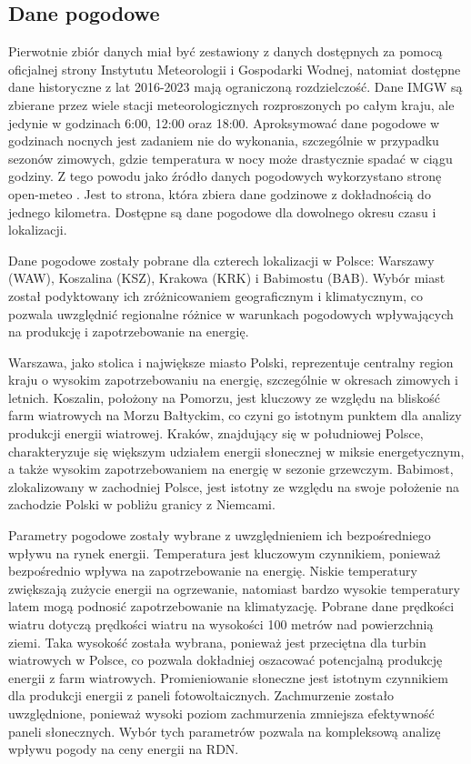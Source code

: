 \subsection{Dane pogodowe}
Pierwotnie zbiór danych miał być zestawiony z danych dostępnych za pomocą oficjalnej strony Instytutu Meteorologii i Gospodarki Wodnej, natomiat dostępne dane historyczne z lat 2016-2023 mają ograniczoną rozdzielczość. Dane IMGW są zbierane przez wiele stacji meteorologicznych rozproszonych po całym kraju, ale jedynie w godzinach 6:00, 12:00 oraz 18:00. Aproksymować dane pogodowe w godzinach nocnych jest zadaniem nie do wykonania, szczególnie w przypadku sezonów zimowych, gdzie temperatura w nocy może drastycznie spadać w ciągu godziny. Z tego powodu jako źródło danych pogodowych wykorzystano stronę open-meteo \cite{METEO}. Jest to strona, która zbiera dane godzinowe z dokładnością do jednego kilometra. Dostępne są dane pogodowe dla dowolnego okresu czasu i lokalizacji.

Dane pogodowe zostały pobrane dla czterech lokalizacji w Polsce: Warszawy (WAW), Koszalina (KSZ), Krakowa (KRK) i Babimostu (BAB). Wybór miast został podyktowany ich zróżnicowaniem geograficznym i klimatycznym, co pozwala uwzględnić regionalne różnice w warunkach pogodowych wpływających na produkcję i zapotrzebowanie na energię. 

Warszawa, jako stolica i największe miasto Polski, reprezentuje centralny region kraju o wysokim zapotrzebowaniu na energię, szczególnie w okresach zimowych i letnich. Koszalin, położony na Pomorzu, jest kluczowy ze względu na bliskość farm wiatrowych na Morzu Bałtyckim, co czyni go istotnym punktem dla analizy produkcji energii wiatrowej. Kraków, znajdujący się w południowej Polsce, charakteryzuje się większym udziałem energii słonecznej w miksie energetycznym, a także wysokim zapotrzebowaniem na energię w sezonie grzewczym. Babimost, zlokalizowany w zachodniej Polsce, jest istotny ze względu na swoje położenie na zachodzie Polski w pobliżu granicy z Niemcami.

Parametry pogodowe zostały wybrane z uwzględnieniem ich bezpośredniego wpływu na rynek energii.\newline
Temperatura jest kluczowym czynnikiem, ponieważ bezpośrednio wpływa na zapotrzebowanie na energię. Niskie temperatury zwiększają zużycie energii na ogrzewanie, natomiast bardzo wysokie temperatury latem mogą podnosić zapotrzebowanie na klimatyzację.\newline
Pobrane dane prędkości wiatru dotyczą prędkości wiatru na wysokości 100 metrów nad powierzchnią ziemi. Taka wysokość została wybrana, ponieważ jest przeciętna dla turbin wiatrowych w Polsce, co pozwala dokładniej oszacować potencjalną produkcję energii z farm wiatrowych.\newline
Promieniowanie słoneczne jest istotnym czynnikiem dla produkcji energii z paneli fotowoltaicznych.\newline
Zachmurzenie zostało uwzględnione, ponieważ wysoki poziom zachmurzenia zmniejsza efektywność paneli słonecznych. 
Wybór tych parametrów pozwala na kompleksową analizę wpływu pogody na ceny energii na RDN.

